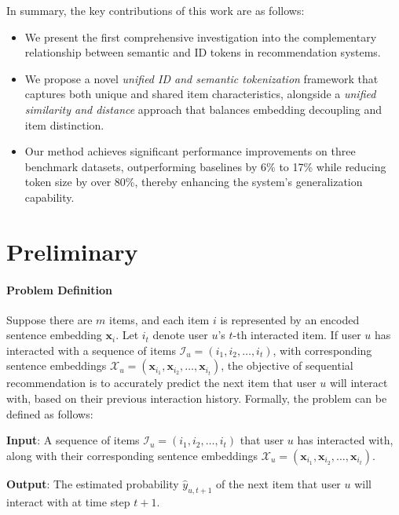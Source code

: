 In summary, the key contributions of this work are as follows: \begin{itemize}[leftmargin=*] \item We present the first comprehensive investigation into the complementary relationship between semantic and ID tokens in recommendation systems. \item We propose a novel \textit{unified ID and semantic tokenization} framework that captures both unique and shared item characteristics, alongside a \textit{unified similarity and distance} approach that balances embedding decoupling and item distinction. \item Our method achieves significant performance improvements on three benchmark datasets, outperforming baselines by 6\% to 17\% while reducing token size by over 80\%, thereby enhancing the system's generalization capability. \end{itemize}



\section{Preliminary}
\paragraph{\textbf{Problem Definition}}
Suppose there are \( m \) items, and each item \( i \) is represented by an encoded sentence embedding \( \boldsymbol{x}_i \). Let \( i_{t} \) denote user \( u \)'s \( t \)-th interacted item. If user \( u \) has interacted with a sequence of items \( \mathcal{I}_{u} = (i_{1}, i_{2}, \ldots, i_{t}) \), with corresponding sentence embeddings \( \mathcal{X}_{u} = (\boldsymbol{x}_{i_{1}}, \boldsymbol{x}_{i_{2}}, \ldots, \boldsymbol{x}_{i_{t}}) \), the objective of sequential recommendation is to accurately predict the next item that user \( u \) will interact with, based on their previous interaction history. Formally, the problem can be defined as follows:

\noindent \textbf{Input}: A sequence of items \( \mathcal{I}_{u} = (i_{1}, i_{2}, \ldots, i_{t}) \) that user \( u \) has interacted with, along with their corresponding sentence embeddings \( \mathcal{X}_{u} = (\boldsymbol{x}_{i_{1}}, \boldsymbol{x}_{i_{2}}, \ldots, \boldsymbol{x}_{i_{t}}) \).

\noindent \textbf{Output}: The estimated probability \( \hat{y}_{u, t+1} \) of the next item that user \( u \) will interact with at time step \( t + 1 \).


